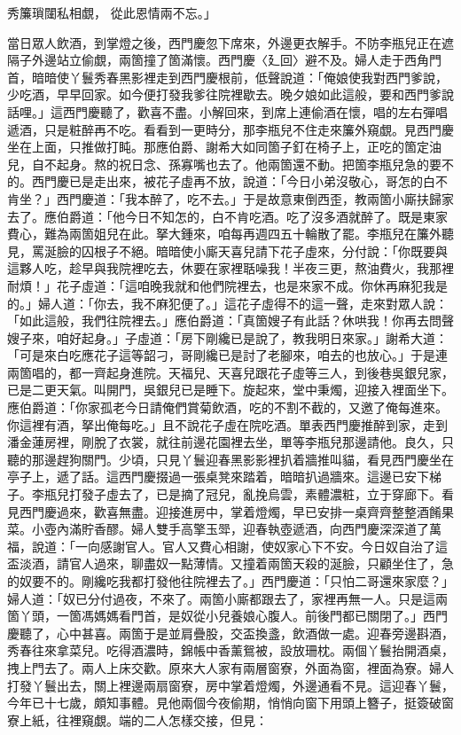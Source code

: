 \begin{showcontents}{}
秀簾瑣闥私相覷，  從此恩情兩不忘。」

當日眾人飲酒，到掌燈之後，西門慶忽下席來，外邊更衣解手。不防李瓶兒正在遮隔子外邊站立偷覷，兩箇撞了箇滿懷。西門慶〈廴回〉避不及。婦人走于西角門首，暗暗使丫鬟秀春黑影裡走到西門慶根前，低聲說道：「俺娘使我對西門爹說，少吃酒，早早回家。如今便打發我爹往院裡歇去。晚夕娘如此這般，要和西門爹說話哩。」這西門慶聽了，歡喜不盡。小解回來，到席上連偷酒在懷，唱的左右彈唱遞酒，只是粧醉再不吃。看看到一更時分，那李瓶兒不住走來簾外窺覷。見西門慶坐在上面，只推做打盹。那應伯爵、謝希大如同箇子釘在椅子上，正吃的箇定油兒，自不起身。熬的祝日念、孫寡嘴也去了。他兩箇還不動。把箇李瓶兒急的要不的。西門慶已是走出來，被花子虛再不放，說道：「今日小弟沒敬心，哥怎的白不肯坐？」西門慶道：「我本醉了，吃不去。」于是故意東倒西歪，教兩箇小廝扶歸家去了。應伯爵道：「他今日不知怎的，白不肯吃酒。吃了沒多酒就醉了。既是東家費心，難為兩箇姐兒在此。拏大鍾來，咱每再週四五十輪散了罷。李瓶兒在簾外聽見，罵涎臉的囚根子不絕。暗暗使小廝天喜兒請下花子虛來，分付說：「你既要與這夥人吃，趁早與我院裡吃去，休要在家裡聒噪我！半夜三更，熬油費火，我那裡耐煩！」花子虛道：「這咱晚我就和他們院裡去，也是來家不成。你休再麻犯我是的。」婦人道：「你去，我不麻犯便了。」這花子虛得不的這一聲，走來對眾人說：「如此這般，我們往院裡去。」應伯爵道：「真箇嫂子有此話？休哄我！你再去問聲嫂子來，咱好起身。」子虛道：「房下剛纔已是說了，教我明日來家。」謝希大道：「可是來白吃應花子這等韶刁，哥剛纔已是討了老腳來，咱去的也放心。」于是連兩箇唱的，都一齊起身進院。天福兒、天喜兒跟花子虛等三人，到後巷吳銀兒家，已是二更天氣。叫開門，吳銀兒已是睡下。旋起來，堂中秉燭，迎接入裡面坐下。應伯爵道：「你家孤老今日請俺們賞菊飲酒，吃的不割不截的，又邀了俺每進來。你這裡有酒，拏出俺每吃。」且不說花子虛在院吃酒。單表西門慶推醉到家，走到潘金蓮房裡，剛脫了衣裳，就往前邊花園裡去坐，單等李瓶兒那邊請他。良久，只聽的那邊趕狗關門。少頃，只見丫鬟迎春黑影影裡扒着牆推叫貓，看見西門慶坐在亭子上，遞了話。這西門慶掇過一張桌凳來踏着，暗暗扒過牆來。這邊已安下梯子。李瓶兒打發子虛去了，已是摘了冠兒，亂挽烏雲，素體濃粧，立于穿廊下。看見西門慶過來，歡喜無盡。迎接進房中，掌着燈燭，早已安排一桌齊齊整整酒餚果菜。小壺內滿貯香醪。婦人雙手高擎玉斝，迎春執壺遞酒，向西門慶深深道了萬福，說道：「一向感謝官人。官人又費心相謝，使奴家心下不安。今日奴自治了這盃淡酒，請官人過來，聊盡奴一點薄情。又撞着兩箇天殺的涎臉，只顧坐住了，急的奴要不的。剛纔吃我都打發他往院裡去了。」西門慶道：「只怕二哥還來家麼？」婦人道：「奴已分付過夜，不來了。兩箇小廝都跟去了，家裡再無一人。只是這兩箇丫頭，一箇馮媽媽看門首，是奴從小兒養娘心腹人。前後門都已關閉了。」西門慶聽了，心中甚喜。兩箇于是並肩疊股，交盃換盞，飲酒做一處。迎春旁邊斟酒，秀春往來拿菜兒。吃得酒濃時，錦帳中香薰鴛被，設放珊枕。兩個丫鬟抬開酒桌，拽上門去了。兩人上床交歡。原來大人家有兩層窗寮，外面為窗，裡面為寮。婦人打發丫鬟出去，關上裡邊兩扇窗寮，房中掌着燈燭，外邊通看不見。這迎春丫鬟，今年已十七歲，頗知事體。見他兩個今夜偷期，悄悄向窗下用頭上簪子，挺簽破窗寮上紙，往裡窺覷。端的二人怎樣交接，但見：


\end{showcontents}
